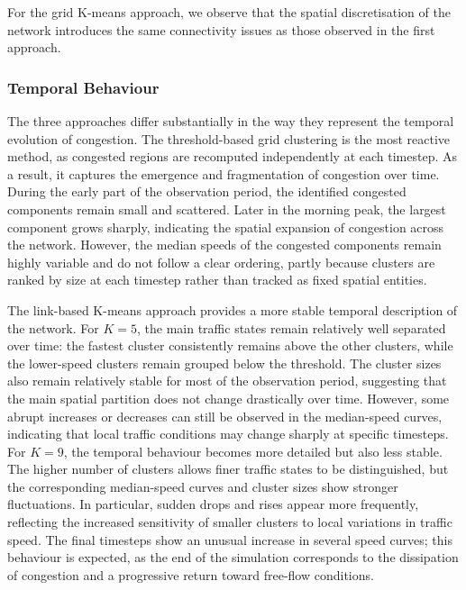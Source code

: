 \documentclass[11pt,a4paper]{article}
\begin{document}
For the grid K-means approach, we observe that the spatial discretisation of the network introduces the same connectivity issues as those observed in the first approach. 

\subsubsection{Temporal Behaviour}

The three approaches differ substantially in the way they represent the temporal evolution of congestion. The threshold-based grid clustering is the most reactive method, as congested regions are recomputed independently at each timestep. As a result, it captures the emergence and fragmentation of congestion over time. During the early part of the observation period, the identified congested components remain small and scattered. Later in the morning peak, the largest component grows sharply, indicating the spatial expansion of congestion across the network. However, the median speeds of the congested components remain highly variable and do not follow a clear ordering, partly because clusters are ranked by size at each timestep rather than tracked as fixed spatial entities.

The link-based K-means approach provides a more stable temporal description of the network. For $K=5$, the main traffic states remain relatively well separated over time: the fastest cluster consistently remains above the other clusters, while the lower-speed clusters remain grouped below the threshold. The cluster sizes also remain relatively stable for most of the observation period, suggesting that the main spatial partition does not change drastically over time. However, some abrupt increases or decreases can still be observed in the median-speed curves, indicating that local traffic conditions may change sharply at specific timesteps.
For $K=9$, the temporal behaviour becomes more detailed but also less stable. The higher number of clusters allows finer traffic states to be distinguished, but the corresponding median-speed curves and cluster sizes show stronger fluctuations. In particular, sudden drops and rises appear more frequently, reflecting the increased sensitivity of smaller clusters to local variations in traffic speed. The final timesteps show an unusual increase in several speed curves; this behaviour is expected, as the end of the simulation corresponds to the dissipation of congestion and a progressive return toward free-flow conditions.
\end{document}
